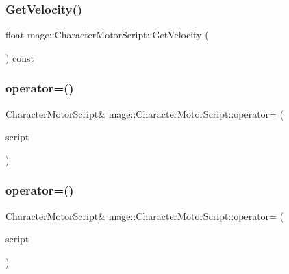 \subsubsection{\texorpdfstring{Get\+Velocity()}{GetVelocity()}}
{\footnotesize\ttfamily float mage\+::\+Character\+Motor\+Script\+::\+Get\+Velocity (\begin{DoxyParamCaption}{ }\end{DoxyParamCaption}) const\hspace{0.3cm}{\ttfamily [noexcept]}}

\hypertarget{classmage_1_1_character_motor_script_a5b66cbbe6b829fe56a1bba5f9093b36e}{}\label{classmage_1_1_character_motor_script_a5b66cbbe6b829fe56a1bba5f9093b36e} 
\subsubsection{\texorpdfstring{operator=()}{operator=()}\hspace{0.1cm}{\footnotesize\ttfamily [1/2]}}
{\footnotesize\ttfamily \hyperlink{classmage_1_1_character_motor_script}{Character\+Motor\+Script}\& mage\+::\+Character\+Motor\+Script\+::operator= (\begin{DoxyParamCaption}\item[{const \hyperlink{classmage_1_1_character_motor_script}{Character\+Motor\+Script} \&}]{script }\end{DoxyParamCaption})\hspace{0.3cm}{\ttfamily [delete]}}

\hypertarget{classmage_1_1_character_motor_script_a05e8822fa633d8642702d125b26069f7}{}\label{classmage_1_1_character_motor_script_a05e8822fa633d8642702d125b26069f7} 
\subsubsection{\texorpdfstring{operator=()}{operator=()}\hspace{0.1cm}{\footnotesize\ttfamily [2/2]}}
{\footnotesize\ttfamily \hyperlink{classmage_1_1_character_motor_script}{Character\+Motor\+Script}\& mage\+::\+Character\+Motor\+Script\+::operator= (\begin{DoxyParamCaption}\item[{\hyperlink{classmage_1_1_character_motor_script}{Character\+Motor\+Script} \&\&}]{script }\end{DoxyParamCaption})\hspace{0.3cm}{\ttfamily [delete]}}

